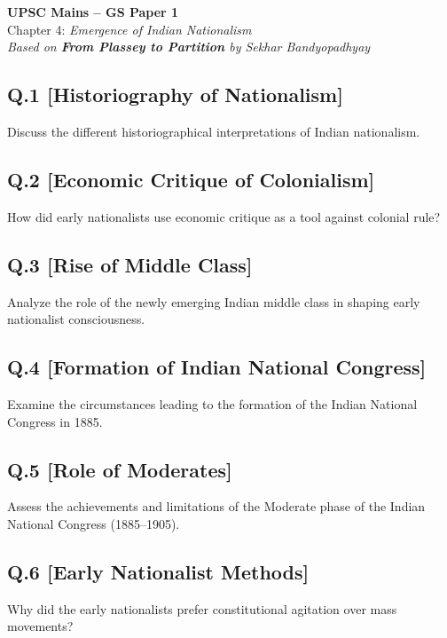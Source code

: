 \begin{center}
    \Large\textbf{UPSC Mains – GS Paper 1}\\
    \normalsize Chapter 4: \textit{Emergence of Indian Nationalism}\\
    \vspace{0.5em}
    \textit{Based on \textbf{From Plassey to Partition} by Sekhar Bandyopadhyay}
\end{center}

\vspace{1em}

\subsection*{Q.1 [Historiography of Nationalism]}
Discuss the different historiographical interpretations of Indian nationalism.

\subsection*{Q.2 [Economic Critique of Colonialism]}
How did early nationalists use economic critique as a tool against colonial rule?

\subsection*{Q.3 [Rise of Middle Class]}
Analyze the role of the newly emerging Indian middle class in shaping early nationalist consciousness.

\subsection*{Q.4 [Formation of Indian National Congress]}
Examine the circumstances leading to the formation of the Indian National Congress in 1885.

\subsection*{Q.5 [Role of Moderates]}
Assess the achievements and limitations of the Moderate phase of the Indian National Congress (1885–1905).

\subsection*{Q.6 [Early Nationalist Methods]}
Why did the early nationalists prefer constitutional agitation over mass movements?

